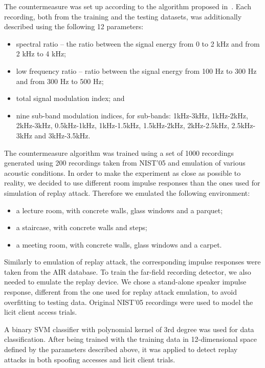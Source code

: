The countermeasure was set up according to the algorithm proposed in~\cite{Villalba2011}. Each recording, both from the training and the testing datasets, was additionally described using the following 12 parameters:
\begin{itemize}
\item spectral ratio -- the ratio between
the signal energy from 0 to 2 kHz and from 2 kHz to 4 kHz;
\item low frequency ratio -- ratio between the signal energy from 100 Hz to 300 Hz
and from 300 Hz to 500 Hz;
\item total signal modulation index; and
\item nine sub-band modulation indices, for sub-bands: 1kHz-3kHz, 1kHz-2kHz,
2kHz-3kHz, 0.5kHz-1kHz, 1kHz-1.5kHz, 1.5kHz-2kHz, 2kHz-2.5kHz, 2.5kHz-3kHz and 3kHz-3.5kHz.
\end{itemize}

The countermeasure algorithm was trained using a set of 1000 recordings generated using 200 recordings taken from NIST'05 and emulation of various acoustic conditions. In order to make the experiment as close as possible to reality, we decided to use different room impulse responses than the ones used for simulation of replay attack. Therefore we emulated the following environment:
\begin{itemize}
\item a lecture room, with concrete walls, glass windows and a parquet;
\item a staircase, with concrete walls and steps;
\item a meeting room, with concrete walls, glass windows and a carpet.
\end{itemize}

Similarly to emulation of replay attack, the corresponding impulse responses were taken from the AIR database. To train the far-field recording detector, we also needed to emulate the replay device. We chose a stand-alone speaker impulse response, different from the one used for replay attack emulation, to avoid overfitting to testing data. Original NIST'05 recordings were used to model the licit client access trials.

A binary SVM classifier with polynomial kernel of 3rd degree was used for data classification. After being trained with the training data in 12-dimensional space defined by the parameters described above, it was applied to detect replay attacks in both spoofing accesses and licit client trials.
